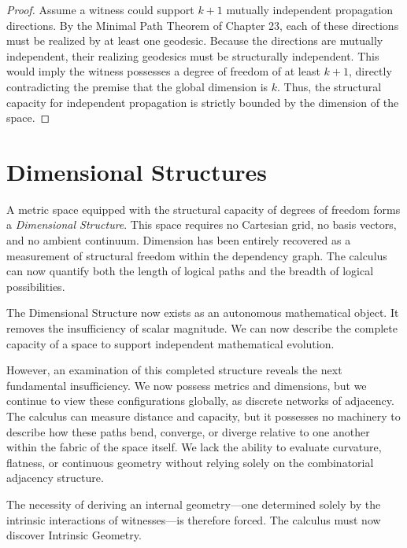 \documentclass[12pt,anyside]{book}
\newcommand{\term}[1]{\textit{#1}}             %
\begin{document}
\begin{proof}
Assume a witness could support $k+1$ mutually independent propagation directions. By the Minimal Path Theorem of Chapter 23, each of these directions must be realized by at least one geodesic. Because the directions are mutually independent, their realizing geodesics must be structurally independent. This would imply the witness possesses a degree of freedom of at least $k+1$, directly contradicting the premise that the global dimension is $k$. Thus, the structural capacity for independent propagation is strictly bounded by the dimension of the space.
\end{proof}

\section{Dimensional Structures}
A metric space equipped with the structural capacity of degrees of freedom forms a \term{Dimensional Structure}. This space requires no Cartesian grid, no basis vectors, and no ambient continuum. Dimension has been entirely recovered as a measurement of structural freedom within the dependency graph. The calculus can now quantify both the length of logical paths and the breadth of logical possibilities.

The Dimensional Structure now exists as an autonomous mathematical object. It removes the insufficiency of scalar magnitude. We can now describe the complete capacity of a space to support independent mathematical evolution.

However, an examination of this completed structure reveals the next fundamental insufficiency. We now possess metrics and dimensions, but we continue to view these configurations globally, as discrete networks of adjacency. The calculus can measure distance and capacity, but it possesses no machinery to describe how these paths bend, converge, or diverge relative to one another within the fabric of the space itself. We lack the ability to evaluate curvature, flatness, or continuous geometry without relying solely on the combinatorial adjacency structure. 

The necessity of deriving an internal geometry---one determined solely by the intrinsic interactions of witnesses---is therefore forced. The calculus must now discover Intrinsic Geometry.
\end{document}
